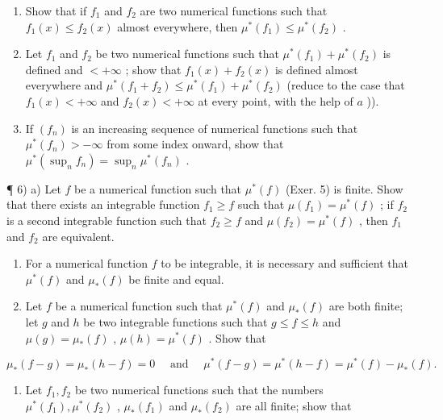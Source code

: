 \begin{enumerate}
\def\labelenumi{\alph{enumi})}
\item
  Show that if \(f_{1}\) and \(f_{2}\) are two numerical functions such that \(f_{1}(x) \leqslant f_{2}(x)\) almost everywhere, then \(\mu^{*}(f_{1}) \leqslant \mu^{*}(f_{2})\) .
\item
  Let \(f_{1}\) and \(f_{2}\) be two numerical functions such that \(\mu^{*}(f_{1}) + \mu^{*}(f_{2})\) is defined and \(< +\infty\) ; show that \(f_{1}(x) + f_{2}(x)\) is defined almost everywhere and \(\mu^{*}(f_{1} + f_{2}) \leqslant \mu^{*}(f_{1}) + \mu^{*}(f_{2})\) (reduce to the case that \(f_{1}(x) < +\infty\) and \(f_{2}(x) < +\infty\) at every point, with the help of \(a\) )).
\item
  If \((f_n)\) is an increasing sequence of numerical functions such that \(\mu^{*}(f_{n}) > -\infty\) from some index onward, show that \(\mu^{*}(\sup_{n} f_{n}) = \sup_{n} \mu^{*}(f_{n})\) .
\end{enumerate}

¶ 6) a) Let \(f\) be a numerical function such that \(\mu^{*}(f)\) (Exer. 5) is finite. Show that there exists an integrable function \(f_{1} \geqslant f\) such that \(\mu(f_{1}) = \mu^{*}(f)\) ; if \(f_{2}\) is a second integrable function such that \(f_{2} \geqslant f\) and \(\mu(f_{2}) = \mu^{*}(f)\) , then \(f_{1}\) and \(f_{2}\) are equivalent.

\begin{enumerate}
\def\labelenumi{\alph{enumi})}
\setcounter{enumi}{1}
\item
  For a numerical function \(f\) to be integrable, it is necessary and sufficient that \(\mu^{*}(f)\) and \(\mu_{*}(f)\) be finite and equal.
\item
  Let \(f\) be a numerical function such that \(\mu^{*}(f)\) and \(\mu_{*}(f)\) are both finite; let \(g\) and \(h\) be two integrable functions such that \(g \leqslant f \leqslant h\) and \(\mu(g) = \mu_{*}(f)\) , \(\mu(h) = \mu^{*}(f)\) . Show that
\end{enumerate}

\[
\mu_ {*} (f - g) = \mu_ {*} (h - f) = 0 \quad \text { and } \quad \mu^ {*} (f - g) = \mu^ {*} (h - f) = \mu^ {*} (f) - \mu_ {*} (f).
\]

\begin{enumerate}
\def\labelenumi{\alph{enumi})}
\setcounter{enumi}{3}
\tightlist
\item
  Let \(f_{1}, f_{2}\) be two numerical functions such that the numbers \(\mu^{*}(f_{1}), \mu^{*}(f_{2})\) , \(\mu_{*}(f_{1})\) and \(\mu_{*}(f_{2})\) are all finite; show that
\end{enumerate}

